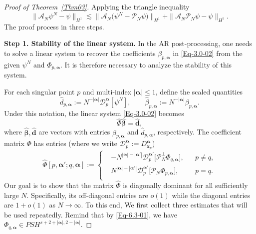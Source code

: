 \documentclass{sn-jnl}%
\numberwithin{equation}{section}
\theoremstyle{thmstyleone}%
\theoremstyle{thmstyletwo}%
\theoremstyle{thmstylethree}%
\begin{document}
\begin{proof}[Proof of Theorem~\ref{Thm03}]
    Applying the triangle inequality
    \begin{equation}\label{Eq-thm03-03}
         \|\mathcal{A}_N \psi^N-\psi\|_{H^{1}}\lesssim  
         \big\|\mathcal{A}_N \big(\psi^N-\mathcal{P}_N\psi\big)\big\|_{H^{1}}+ \|\mathcal{A}_N \mathcal{P}_N\psi-\psi\|_{H^{1}}.
    \end{equation}
    The proof process in three steps.
    
    \textbf{Step 1. Stability of the linear system.}
   In the AR post-processing, one needs to solve a linear system to recover the coefficients $\beta_{p,\bm \alpha}$ in \eqref{Eq-3.0-02} from the given $\psi^N$ and $\Phi_{p,\bm \alpha}$. It is therefore necessary to analyze the stability of this system.

    For each singular point $p$ and multi-index $|\bm \alpha|\leq 1$, define the scaled quantities
    \begin{equation}\label{eq-thm2-SCALE}
    \hat{d}_{p,\bm \alpha}
    :=
    N^{-|\bm \alpha|}
    \mathcal{D}^{\bm \alpha}_{p}[\psi^N],
    \qquad
    \hat{\beta}_{p,\bm \alpha}
    :=
    N^{-|\bm \alpha|}
    \beta_{p,\bm \alpha}.
    \end{equation}
    Under this notation, the linear system \eqref{Eq-3.0-02} becomes
    \[
    \hat\Phi \bm{\hat{\beta}}
    =
    \bm{\hat{d}},
    \]
    where $\bm{\hat{\beta}},\bm{\hat{d}}$ are vectors with entries $\hat{\beta}_{p,\bm \alpha}$ and $\hat{d}_{p,\bm \alpha}$, respectively. The coefficient matrix $\Phi$ has entries (where we write $\mathcal{D}_p^{\bm \alpha }:= D_{\bm x_p}^{\bm \alpha}$)
    \begin{equation}
        \hat\Phi[p,\bm \alpha';q,\bm \alpha]:= \left\{
        \begin{aligned}
           &-N^{|\bm \alpha|-|\bm \alpha'|}\mathcal{D}^{\bm \alpha'}_p\bigl[\mathcal{P}_N^\perp\Phi_{q,\bm \alpha}\bigr],&& p\neq q,\\
           &N^{|\bm \alpha|-|\bm \alpha'|}\mathcal{D}^{\bm \alpha'}_p\bigl[\mathcal{P}_N\Phi_{p,\bm \alpha}\bigr],&& p= q.\\
        \end{aligned}
        \right.
    \end{equation}
    Our goal is to show that the matrix $\hat\Phi$ is diagonally dominant for all sufficiently large $N$. Specifically, its off‑diagonal entries are $o(1)$ while the diagonal entries are $1+o(1)$ as $N\to \infty$. To this end, We first collect three estimates that will be used repeatedly.
    Remind that by \eqref{Eq-6.3-01}, we have $\Phi_{q,\bm \alpha}\in PSH^{s+2+|\bm \alpha|,2-|\bm \alpha|}$.
    

\end{proof}
\end{document}
